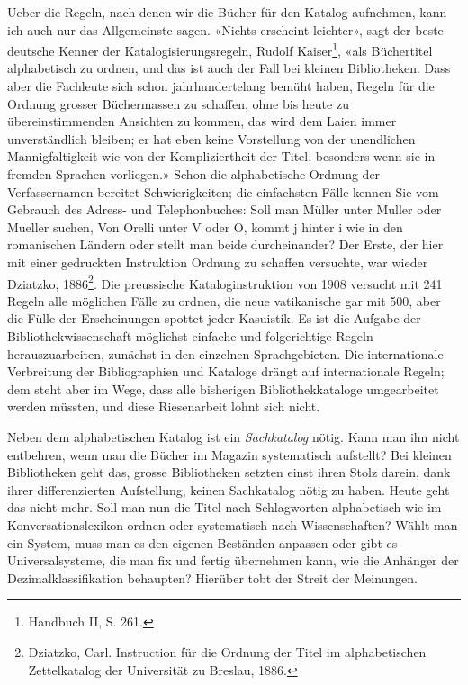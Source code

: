 \documentclass[a4paper,
fontsize=11pt,
oneside,
numbers=noperiodatend,
parskip=half-,
bibliography=totoc,
final
]{scrartcl}
\begin{document}
Ueber die Regeln, nach denen wir die Bücher für den Katalog aufnehmen,
kann ich auch nur das Allgemeinste sagen. «Nichts erscheint leichter»,
sagt der beste deutsche Kenner der Katalogisierungsregeln, Rudolf
Kaiser\footnote{Handbuch II, S. 261.}, «als Büchertitel alphabetisch zu
ordnen, und das ist auch der Fall bei kleinen Bibliotheken. Dass aber
die Fachleute sich schon jahrhundertelang bemüht haben, Regeln für die
Ordnung grosser Büchermassen zu schaffen, ohne bis heute zu
übereinstimmenden Ansichten zu kommen, das wird dem Laien immer
unverständlich bleiben; er hat eben keine Vorstellung von der
unendlichen Mannigfaltigkeit wie von der Kompliziertheit der Titel,
besonders wenn sie in fremden Sprachen vorliegen.» Schon die
alphabetische Ordnung der Verfassernamen bereitet Schwierigkeiten; die
einfachsten Fälle kennen Sie vom Gebrauch des Adress- und
Telephonbuches: Soll man Müller unter Muller oder Mueller suchen, Von
Orelli unter V oder O, kommt j hinter i wie in den romanischen Ländern
oder stellt man beide durcheinander? Der Erste, der hier mit einer
gedruckten Instruktion Ordnung zu schaffen versuchte, war wieder
Dziatzko, 1886\footnote{Dziatzko, Carl. Instruction für die Ordnung der
  Titel im alphabetischen Zettelkatalog der Universität zu Breslau,
  1886.}. Die preussische Kataloginstruktion von 1908 versucht mit 241
Regeln alle möglichen Fälle zu ordnen, die neue vatikanische gar mit
500, aber die Fülle der Erscheinungen spottet jeder Kasuistik. Es ist
die Aufgabe der Bibliothekwissenschaft möglichst einfache und
folgerichtige Regeln herauszuarbeiten, zunächst in den einzelnen
Sprachgebieten. Die internationale Verbreitung der Bibliographien und
Kataloge drängt auf internationale Regeln; dem steht aber im Wege, dass
alle bisherigen Bibliothekkataloge umgearbeitet werden müssten, und
diese Riesenarbeit lohnt sich nicht.

Neben dem alphabetischen Katalog ist ein \emph{Sachkatalog} nötig. Kann
man ihn nicht entbehren, wenn man die Bücher im Magazin systematisch
aufstellt? Bei kleinen Bibliotheken geht das, grosse Bibliotheken
setzten einst ihren Stolz darein, dank ihrer differenzierten
Aufstellung, keinen Sachkatalog nötig zu haben. Heute geht das nicht
mehr. Soll man nun die Titel nach Schlagworten alphabetisch wie im
Konversationslexikon ordnen oder systematisch nach Wissenschaften? Wählt
man ein System, muss man es den eigenen Beständen anpassen oder gibt es
Universalsysteme, die man fix und fertig übernehmen kann, wie die
Anhänger der Dezimalklassifikation behaupten? Hierüber tobt der Streit
der Meinungen.
\end{document}
